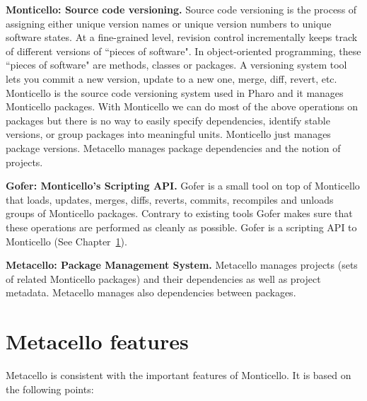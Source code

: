 \documentclass[a4paper,10pt,twoside]{book}
\begin{document}
\begin{description}

\item{\textbf{Monticello: Source code versioning.}}
Source code versioning is the process of assigning either unique version names or unique version numbers to unique software states. At a fine-grained level, revision control incrementally keeps track of different versions of ``pieces of software". In object-oriented programming, these ``pieces of software" are methods, classes or packages. A versioning system tool lets you commit a new version, update to a new one, merge, diff, revert, etc. Monticello is the source code versioning system used in Pharo and it manages Monticello packages. With Monticello we can do most of the above operations on packages but there is no way to easily specify dependencies, identify stable versions, or group packages into meaningful units.  Monticello just manages package versions. Metacello manages package dependencies and the notion of projects.

\item {\textbf{Gofer: Monticello's Scripting API.}}
Gofer is a small tool on top of Monticello that loads, updates, merges, diffs, reverts, commits, recompiles and unloads groups of Monticello packages. Contrary to existing tools Gofer makes sure that these operations are performed as cleanly as possible. Gofer is a scripting API to Monticello (See Chapter~\ref{}).


\item{\textbf{Metacello: Package Management System.}} Metacello manages projects (sets of related Monticello packages) and their dependencies as well as project metadata. Metacello manages also dependencies between packages.
\end{description}




\section{Metacello features}

Metacello is consistent with the important features of Monticello. It is based on the following points:
\end{document}
